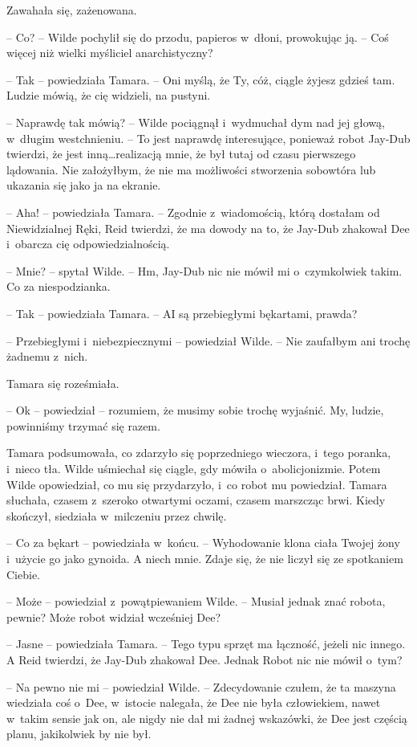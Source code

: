 \documentclass[oneside,polish,11pt,sfheadings]{mwbk}
\begin{document}
Zawahała się, zażenowana.

-- Co? -- Wilde pochylił się do przodu, papieros w~dłoni, prowokując ją. -- Coś więcej niż wielki myśliciel anarchistyczny?

-- Tak -- powiedziała Tamara. -- Oni myślą, że Ty, cóż, ciągle żyjesz
gdzieś tam. Ludzie mówią, że cię widzieli, na pustyni.

-- Naprawdę tak mówią? -- Wilde pociągnął i~wydmuchał dym nad jej głową, w~długim westchnieniu. -- To jest naprawdę interesujące, ponieważ robot
Jay-Dub twierdzi, że jest inną\ldots realizacją mnie, że był tutaj od czasu
pierwszego lądowania. Nie założyłbym, że nie ma możliwości stworzenia
sobowtóra lub ukazania się jako ja na ekranie.

-- Aha! -- powiedziała Tamara. -- Zgodnie z~wiadomością, którą dostałam od
Niewidzialnej Ręki, Reid twierdzi, że ma dowody na to, że Jay-Dub
zhakował Dee i~obarcza cię odpowiedzialnością.

-- Mnie? -- spytał Wilde. -- Hm, Jay-Dub nic nie mówił mi o~czymkolwiek
takim. Co za niespodzianka.

-- Tak -- powiedziała Tamara. -- AI są przebiegłymi bękartami, prawda?

-- Przebiegłymi i~niebezpiecznymi -- powiedział Wilde. -- Nie zaufałbym ani
trochę żadnemu z~nich.

Tamara się roześmiała.

-- Ok -- powiedział -- rozumiem, że musimy sobie trochę wyjaśnić. My,
ludzie, powinniśmy trzymać się razem.

Tamara podsumowała, co zdarzyło się poprzedniego wieczora, i~tego
poranka, i~nieco tła. Wilde uśmiechał się ciągle, gdy mówiła o~abolicjonizmie. Potem Wilde opowiedział, co mu się przydarzyło, i~co
robot mu powiedział. Tamara słuchała, czasem z~szeroko otwartymi oczami,
czasem marszcząc brwi. Kiedy skończył, siedziała w~milczeniu przez
chwilę.

-- Co za bękart -- powiedziała w~końcu. -- Wyhodowanie klona ciała Twojej
żony i~użycie go jako gynoida. A niech mnie. Zdaje się, że nie liczył
się ze spotkaniem Ciebie.

-- Może -- powiedział z~powątpiewaniem Wilde. -- Musiał jednak znać robota,
pewnie? Może robot widział wcześniej Dee?

-- Jasne -- powiedziała Tamara. -- Tego typu sprzęt ma łączność, jeżeli nic
innego. A Reid twierdzi, że Jay-Dub zhakował Dee. Jednak Robot nic nie
mówił o~tym?

-- Na pewno nie mi -- powiedział Wilde. -- Zdecydowanie czułem, że ta
maszyna wiedziała coś o~Dee, w~istocie nalegała, że Dee nie była
człowiekiem, nawet w~takim sensie jak on, ale nigdy nie dał mi żadnej
wskazówki, że Dee jest częścią planu, jakikolwiek by nie był.
\end{document}
